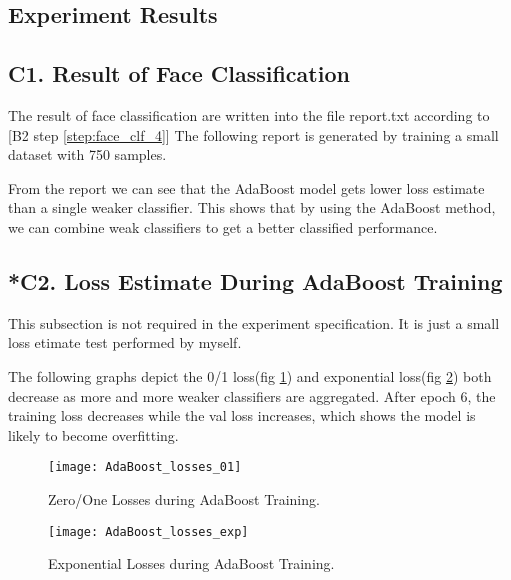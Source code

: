 \documentclass[journal, a4paper]{IEEEtran}
\begin{document}
\subsection{Experiment Results}

\subsection*{C1. Result of Face Classification}
The result of face classification are written into the file report.txt according to [B2 step \ref{step:face_clf_4}]
The following report is generated by training a small dataset with 750 samples.

From the report we can see that the AdaBoost model gets lower loss estimate than a single weaker classifier. This shows that by using the AdaBoost method, we can combine weak classifiers to get a better classified performance.

\subsection*{*C2. Loss Estimate During AdaBoost Training}
This subsection is not required in the experiment specification. It is just a small loss etimate test performed by myself. %

The following graphs depict the 0/1 loss(fig \ref{fig:losses_01}) and exponential loss(fig \ref{fig:losses_exp}) both decrease as more and more weaker classifiers are aggregated. After epoch 6, the training loss decreases while the val loss increases, which shows the model is likely to become overfitting.

\begin{figure}[!hbt]
        \begin{center}
        \texttt{[image: AdaBoost\_losses\_01]}
        \caption{Zero/One Losses during AdaBoost Training.}
        \label{fig:losses_01}
        \end{center}
\end{figure}

\begin{figure}[!hbt]
        \begin{center}
        \texttt{[image: AdaBoost\_losses\_exp]}
        \caption{Exponential Losses during AdaBoost Training.}
        \label{fig:losses_exp}
        \end{center}
\end{figure}
\end{document}
